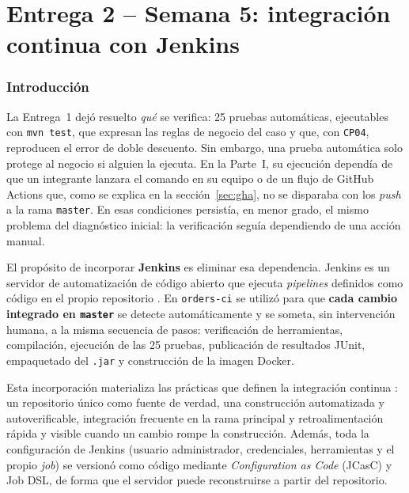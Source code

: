 \documentclass[11pt,a4paper]{article}
\begin{document}
\clearpage
\part{Entrega 2 -- Semana 5: integración continua con Jenkins}

\section{Introducción}
\label{sec:intro2}

La Entrega~1 dejó resuelto \emph{qué} se verifica: 25 pruebas automáticas, ejecutables con
\texttt{mvn test}, que expresan las reglas de negocio del caso y que, con \texttt{CP04}, reproducen
el error de doble descuento. Sin embargo, una prueba automática solo protege al negocio si alguien
la ejecuta. En la Parte~I, su ejecución dependía de que un integrante lanzara el comando en su
equipo o de un flujo de GitHub Actions que, como se explica en la sección~\ref{sec:gha}, no se
disparaba con los \emph{push} a la rama \texttt{master}. En esas condiciones persistía, en menor
grado, el mismo problema del diagnóstico inicial: la verificación seguía dependiendo de una acción
manual.

El propósito de incorporar \textbf{Jenkins} es eliminar esa dependencia. Jenkins es un servidor de
automatización de código abierto que ejecuta \emph{pipelines} definidos como código en el propio
repositorio \cite{jenkins-pipeline}. En \texttt{orders-ci} se utilizó para que \textbf{cada cambio
integrado en \texttt{master}} se detecte automáticamente y se someta, sin intervención humana, a la
misma secuencia de pasos: verificación de herramientas, compilación, ejecución de las 25 pruebas,
publicación de resultados JUnit, empaquetado del \texttt{.jar} y construcción de la imagen Docker.

Esta incorporación materializa las prácticas que definen la integración continua
\cite{fowler-ci,humble-farley}: un repositorio único como fuente de verdad, una construcción
automatizada y autoverificable, integración frecuente en la rama principal y retroalimentación
rápida y visible cuando un cambio rompe la construcción. Además, toda la configuración de Jenkins
(usuario administrador, credenciales, herramientas y el propio \emph{job}) se versionó como código
mediante \emph{Configuration as Code} (JCasC) y Job DSL, de forma que el servidor puede reconstruirse
a partir del repositorio.
\end{document}
